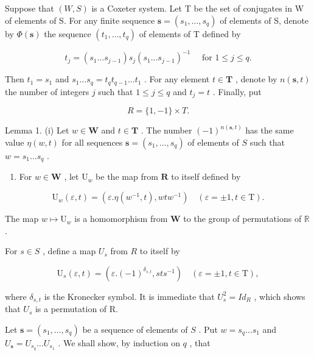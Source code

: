 Suppose that \((W,S)\) is a Coxeter system. Let T be the set of conjugates in W of elements of S. For any finite sequence \(\mathbf{s}=(s_{1},\ldots,s_{q})\) of elements of S, denote by \(\Phi(\mathbf{s})\) the sequence \((t_{1},\ldots,t_{q})\) of elements of T defined by

\[
t _ {j} = \left(s _ {1} \dots s _ {j - 1}\right) s _ {j} \left(s _ {1} \dots s _ {j - 1}\right) ^ {- 1} \quad \text { for } 1 \leqslant j \leqslant q.\tag{11}
\]

Then \(t_1 = s_1\) and \(s_1 \ldots s_q = t_q t_{q-1} \ldots t_1\) . For any element \(t \in \mathbf{T}\) , denote by \(n(\mathbf{s}, t)\) the number of integers \(j\) such that \(1 \leqslant j \leqslant q\) and \(t_j = t\) . Finally, put

\[
R = \{1, - 1 \} \times T.
\]

Lemma 1. (i) Let \(w \in \mathbf{W}\) and \(t \in \mathbf{T}\) . The number \((-1)^{n(\mathbf{s},t)}\) has the same value \(\eta(w,t)\) for all sequences \(\mathbf{s} = (s_1, \ldots, s_q)\) of elements of \(S\) such that \(w = s_1 \ldots s_q\) .

\begin{enumerate}
\def\labelenumi{(\roman{enumi})}
\setcounter{enumi}{1}
\tightlist
\item
  For \(w \in \mathbf{W}\) , let \(\mathrm{U}_w\) be the map from \(\mathbf{R}\) to itself defined by
\end{enumerate}

\[
\mathrm{U} _ {w} (\varepsilon , t) = (\varepsilon . \eta (w ^ {- 1}, t), w t w ^ {- 1}) \quad (\varepsilon = \pm 1, t \in \mathrm{T}).\tag{12}
\]

The map \(w \mapsto \mathrm{U}_w\) is a homomorphism from \(\mathbf{W}\) to the group of permutations of \(\mathbb{R}\) .

For \(s \in S\) , define a map \(U_s\) from \(R\) to itself by

\[
\mathrm{U} _ {s} (\varepsilon , t) = \left(\varepsilon . (- 1) ^ {\delta_ {s, t}}, s t s ^ {- 1}\right) \quad (\varepsilon = \pm 1, t \in \mathrm{T}),\tag{13}
\]

where \(\delta_{s,t}\) is the Kronecker symbol. It is immediate that \(U_{s}^{2} = Id_{R}\) , which shows that \(U_{s}\) is a permutation of R.

Let \(\mathbf{s} = (s_1, \ldots, s_q)\) be a sequence of elements of \(S\) . Put \(w = s_q \ldots s_1\) and \(U_{\mathbf{s}} = U_{s_q} \ldots U_{s_1}\) . We shall show, by induction on \(q\) , that

